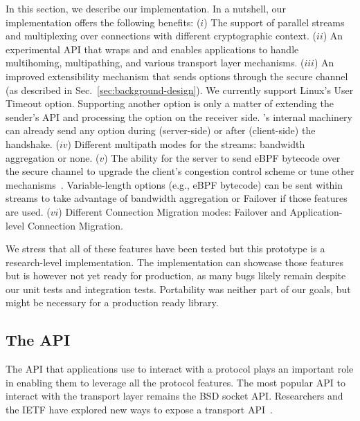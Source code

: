 \label{sec:content}

In this section, we describe our \tcpls implementation.  In a nutshell, our implementation offers the following benefits:
($i$) The support of parallel streams and multiplexing over \tcp connections
  with different cryptographic context.
($ii$) An experimental API that wraps \tls and \tcp and enables applications to
    handle multihoming, multipathing, and various transport layer mechanisms.
($iii$) An improved \tcp extensibility mechanism that sends \tcp options
   through the secure \tcpls channel (as described in
   Sec.~\ref{sec:background-design}). We currently support Linux's \tcp User Timeout
   option. Supporting another \tcp option is only a matter of extending the
   sender's API and processing the option on the receiver side. \tcpls's
   internal machinery can already send any \tcp option during (server-side) or
   after (client-side) the handshake.
($iv$) Different multipath modes for the \tcpls streams: bandwidth aggregation or
none.
($v$) The ability for the server to send eBPF bytecode over the secure
  channel to upgrade the client's \tcp congestion control scheme or
  tune other \tcp mechanisms~\cite{brakmo2017tcp, tran2019beyond}.
  Variable-length options (e.g., eBPF bytecode) can be sent within streams to
  take advantage of bandwidth aggregation or Failover if those features are
  used.
($vi$) Different Connection Migration modes: Failover and Application-level
Connection Migration.


We stress that all of these features have been tested but this prototype is a
research-level implementation. The implementation can
showcase those features but is however not yet ready for production, as many
bugs likely remain despite our unit tests and integration tests. Portability was
neither part of our goals, but might be necessary for a production ready \tcpls
library.  \subsection{The \tcpls API}

The API that applications use to interact with a protocol plays an important
role in enabling them to leverage all the protocol features. The most
popular API to interact with the transport layer remains the BSD socket
API. Researchers and the IETF have explored new ways to expose a transport API~\cite{draft-ietf-taps-arch,hruby2014sockets,rfc6458,hesmans2016enhanced,schmidt2013socket}.


